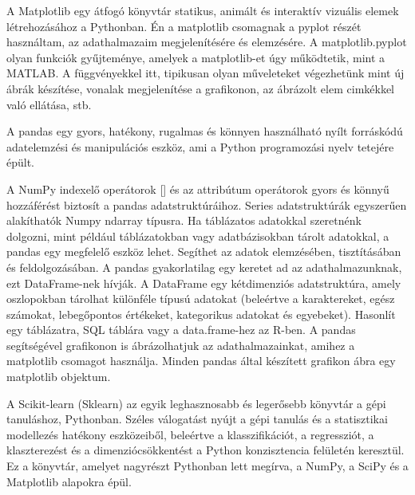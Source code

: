
A Matplotlib egy átfogó könyvtár statikus, animált és interaktív vizuális elemek létrehozásához a Pythonban.
Én a matplotlib csomagnak a pyplot részét használtam, az adathalmazaim megjelenítésére és elemzésére. A matplotlib.pyplot olyan funkciók gyűjteménye, amelyek a matplotlib-et úgy működtetik, mint a MATLAB. A függvényekkel itt, tipikusan olyan műveleteket végezhetünk mint új ábrák készítése, vonalak megjelenítése a grafikonon, az ábrázolt elem cimkékkel való ellátása, stb.


A pandas egy gyors, hatékony, rugalmas és könnyen használható nyílt forráskódú adatelemzési és manipulációs eszköz, ami a Python programozási nyelv tetejére épült.

A NumPy indexelő operátorok [] és az attribútum operátorok gyors és könnyű hozzáférést biztosít a pandas adatstruktúráihoz. Series adatstruktúrák egyszerűen alakíthatók Numpy ndarray típusra.
Ha táblázatos adatokkal szeretnénk dolgozni, mint például táblázatokban vagy adatbázisokban tárolt adatokkal, a pandas egy megfelelő eszköz lehet. Segíthet az adatok elemzésében, tisztításában és feldolgozásában. A pandas gyakorlatilag egy keretet ad az adathalmazunknak, ezt DataFrame-nek hívják. A DataFrame egy kétdimenziós adatstruktúra, amely oszlopokban tárolhat különféle típusú adatokat (beleértve a karaktereket, egész számokat, lebegőpontos értékeket, kategorikus adatokat és egyebeket). Hasonlít egy táblázatra, SQL táblára vagy a data.frame-hez az R-ben.
A pandas segítségével grafikonon is ábrázolhatjuk az adathalmazainkat, amihez a matplotlib csomagot használja. Minden pandas által készített grafikon ábra egy matplotlib objektum.



A Scikit-learn (Sklearn) az egyik leghasznosabb és legerősebb könyvtár a gépi tanuláshoz, Pythonban. Széles válogatást nyújt a gépi tanulás és a statisztikai modellezés hatékony eszközeiből, beleértve a klasszifikációt, a regressziót, a klaszterezést és a dimenziócsökkentést a Python konzisztencia felületén keresztül. Ez a könyvtár, amelyet nagyrészt Pythonban lett megírva, a NumPy, a SciPy és a Matplotlib alapokra épül.
